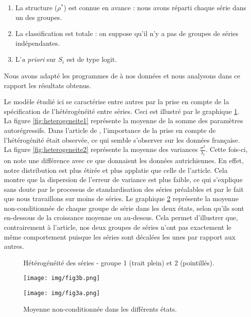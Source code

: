 \documentclass[10pt,french,french]{article}
\begin{document}
\begin{enumerate}
\def\labelenumi{\arabic{enumi}.}
\item
  La structure (\(\rho^*\)) est connue en avance : nous avons réparti chaque série dans un des groupes.
\item
  La classification est totale : on suppose qu'il n'y a pas de groupes de séries indépendantes.
\item
  L'\emph{a priori} sur \(S_i\) est de type logit.
\end{enumerate}

Nous avons adapté les programmes de \cite{Kaufmann} à nos données et nous analysons dans ce rapport les résultats obtenus.

Le modèle étudié ici se caractérise entre autres par la prise en compte de la spécification de l'hétérogénéité entre séries.
Ceci est illustré par le graphique \ref{heterogeneite}.
La figure \ref{fig:heterogeneite1} représente la moyenne de la somme des paramètres autorégressifs.
Dans l'article de \cite{Kaufmann}, l'importance de la prise en compte de l'hétérogénité était observée, ce qui semble s'observer sur les données française.
La figure \ref{fig:heterogeneite2} représente la moyenne des variances \(\frac{\sigma^2}{\lambda_i}\).
Cette fois-ci, on note une différence avec ce que donnaient les données autrichiennes.
En effet, notre distribution est plus étirée et plus applatie que celle de l'article.
Cela montre que la dispersion de l'erreur de variance est plus faible, ce qui s'explique sans doute par le processus de standardisation des séries préalables et par le fait que nous travaillons sur moins de séries.
Le graphique \ref{etats} représente la moyenne non-conditionnée de chaque groupe de série dans les deux états, selon qu'ils sont en-dessous de la croissance moyenne ou au-dessus.
Cela permet d'illustrer que, contrairement à l'article, nos deux groupes de séries n'ont pas exactement le même comportement puisque les séries sont décalées les unes par rapport aux autres.

\begin{figure}[htb]
\caption{Hétérogénéité des séries - groupe 1 (trait plein) et 2 (pointillés).}
\label{heterogeneite}
\end{figure}

\begin{figure}[htb]
\begin{minipage}{.5\textwidth}
\texttt{[image: img/fig3b.png]}
\end{minipage}
\hfill
\begin{minipage}{.5\textwidth}
\texttt{[image: img/fig3a.png]}
\end{minipage}
\caption{Moyenne non-conditionnée dans les différents états.}
\label{etats}
\end{figure}
\end{document}
